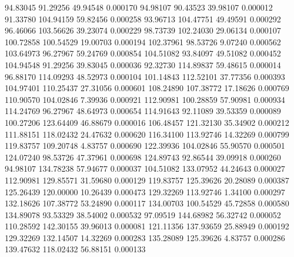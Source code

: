        94.83045       91.29256       49.94548       0.000170
       94.98107       90.43523       39.98107       0.000012
       91.33780      104.94159       59.82456       0.000258
       93.96713      104.47751       49.49591       0.000292
       96.46066      103.56626       39.23074       0.000229
       98.73739      102.24030       29.06134       0.000107
      100.72858      100.54529       19.00703       0.000194
      102.37961       98.53726        9.07240       0.000562
      103.64973       96.27967       59.24769       0.000854
      104.51082       93.84097       49.51082       0.000452
      104.94548       91.29256       39.83045       0.000036
       92.32730      114.89837       59.48615       0.000014
       96.88170      114.09293       48.52973       0.000104
      101.14843      112.52101       37.77356       0.000393
      104.97401      110.25437       27.31056       0.000601
      108.24890      107.38772       17.18626       0.000769
      110.90570      104.02846        7.39936       0.000921
      112.90981      100.28859       57.90981       0.000934
      114.24769       96.27967       48.64973       0.000654
      114.91643       92.11089       39.53359       0.000089
      100.27206      123.64409       46.88679       0.000016
      106.48457      121.32130       35.34902       0.000212
      111.88151      118.02432       24.47632       0.000620
      116.34100      113.92746       14.32269       0.000799
      119.83757      109.20748        4.83757       0.000690
      122.39936      104.02846       55.90570       0.000501
      124.07240       98.53726       47.37961       0.000698
      124.89743       92.86544       39.09918       0.000260
       94.98107      134.78238       57.94677       0.000037
      104.51082      133.07952       44.24643       0.000027
      112.90981      129.85571       31.59680       0.000129
      119.83757      125.39626       20.28089       0.000387
      125.26439      120.00000       10.26439       0.000473
      129.32269      113.92746        1.34100       0.000297
      132.18626      107.38772       53.24890       0.000117
      134.00703      100.54529       45.72858       0.000580
      134.89078       93.53329       38.54002       0.000532
       97.09519      144.68982       56.32742       0.000052
      110.28592      142.30155       39.96013       0.000081
      121.11356      137.93659       25.88949       0.000192
      129.32269      132.14507       14.32269       0.000283
      135.28089      125.39626        4.83757       0.000286
      139.47632      118.02432       56.88151       0.000133
